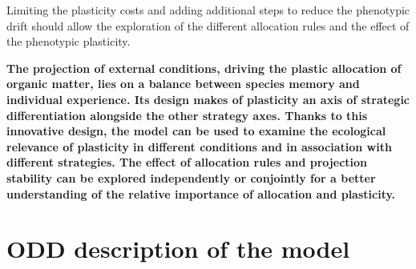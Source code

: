 Limiting the plasticity costs and adding additional steps to reduce the phenotypic drift should allow the exploration of the different allocation rules and the effect of the phenotypic plasticity.
%
%
%
%
%
%

 
 
\textbf{The projection of external conditions, driving the plastic allocation of organic matter, lies on a balance between species memory and individual experience. Its design makes of plasticity an axis of strategic differentiation alongside the other strategy axes. Thanks to this innovative design, the model can be used to examine the ecological relevance of plasticity in different conditions and in association with different strategies. The effect of allocation rules and projection stability can be explored independently or conjointly for a better understanding of the relative importance of allocation and plasticity.}




\chapter{ODD description of the model \model}\label{chapter:model-description}

